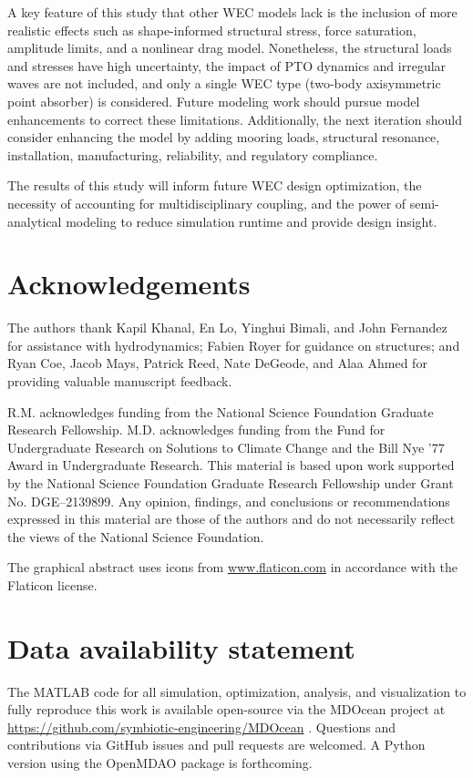 \documentclass[preprint,12pt]{elsarticle}
\begin{document}
A key feature of this study that other WEC models lack is the inclusion of more realistic effects such as shape-informed structural stress, force saturation, amplitude limits, and a nonlinear drag model.
Nonetheless, the structural loads and stresses have high uncertainty, the impact of PTO dynamics and irregular waves are not included, and only a single WEC type (two-body axisymmetric point absorber) is considered.
Future modeling work should pursue model enhancements to correct these limitations.
Additionally, the next iteration should consider enhancing the model by adding mooring loads, structural resonance, installation, manufacturing, reliability, and regulatory compliance. 

The results of this study will inform future WEC design optimization, the necessity of accounting for multidisciplinary coupling, and the power of semi-analytical modeling to reduce simulation runtime and provide design insight.

\section*{Acknowledgements}
The authors thank Kapil Khanal, En Lo, Yinghui Bimali, and John Fernandez for assistance with hydrodynamics; Fabien Royer for guidance on structures; and Ryan Coe, Jacob Mays, Patrick Reed, Nate DeGeode, and Alaa Ahmed for providing valuable manuscript feedback.

R.M. acknowledges funding from the National Science Foundation Graduate Research Fellowship.
M.D. acknowledges funding from the Fund for Undergraduate Research on Solutions to Climate Change and the Bill Nye ’77 Award in Undergraduate Research.
This material is based upon work supported by the National Science Foundation Graduate Research Fellowship under Grant No.
DGE–2139899.
Any opinion, findings, and conclusions or recommendations expressed in this material are those of the authors and do not necessarily reflect the views of the National Science Foundation.

The graphical abstract uses icons from \url{www.flaticon.com} in accordance with the Flaticon license.

\section*{Data availability statement}
The MATLAB code for all simulation, optimization, analysis, and visualization to fully reproduce this work is available open-source via the MDOcean project at \url{https://github.com/symbiotic-engineering/MDOcean} \cite{mccabe_mdocean_2024}.
Questions and contributions via GitHub issues and pull requests are welcomed.
A Python version using the OpenMDAO package is forthcoming. %
\end{document}
